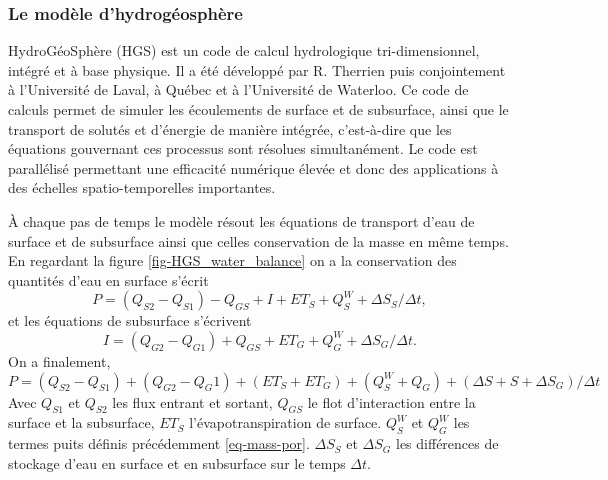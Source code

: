 \documentclass[a4paper,11pt]{article}
\numberwithin{equation}{section}
\begin{document}
\subsubsection{Le modèle d'hydrogéosphère}

HydroGéoSphère (HGS) est un code de calcul hydrologique tri-dimensionnel, intégré et à base physique. Il a été développé par R. Therrien puis conjointement à l’Université de Laval, à Québec et à l’Université de Waterloo. Ce code de calculs permet de simuler les écoulements de surface et de subsurface, ainsi que le transport de solutés et d’énergie de manière intégrée, c’est-à-dire que les équations gouvernant ces processus sont résolues simultanément. Le code est parallélisé permettant une efficacité numérique élevée et donc des applications à des échelles spatio-temporelles importantes.

À chaque pas de temps le modèle résout les équations de transport d'eau de surface et de subsurface ainsi que celles conservation de la masse en même temps. En regardant la figure \ref{fig-HGS_water_balance} on a la conservation des quantités d'eau en surface s'écrit
\begin{equation}
	\label{eq-HGS-surface}
	P = (Q_{S2}-Q_{S1})-Q_{GS}+I+ET_S+Q^W_S+\Delta S_S /\Delta t,
\end{equation}
et les équations de subsurface s'écrivent
\begin{equation}
	\label{eq-HGS-subsurface}
	I = (Q_{G2}-Q_{G1})+Q_{GS}+ET_G + Q^W_G+\Delta S_G/\Delta t.
\end{equation}
On a finalement,
\begin{equation}
	\label{eq-HGS-bilan-tot}
	P=(Q_{S2}-Q_{S1})+(Q_{G2}-Q_G1)+(ET_S+ET_G)+(Q^W_S+Q_G)+(\Delta S+S+\Delta S_G)/\Delta t
\end{equation}
Avec $Q_{S1}$ et $Q_{S2}$ les flux entrant et sortant, $Q_{GS}$ le flot d'interaction entre la surface et la subsurface, $ET_S$ l'évapotranspiration de surface. $Q^W_S$ et $Q^W_G$ les termes puits définis précédemment \eqref{eq-mass-por}. $\Delta S_S$ et $\Delta S_G$ les différences de stockage d'eau en surface et en subsurface sur le temps $\Delta t$.
\end{document}

